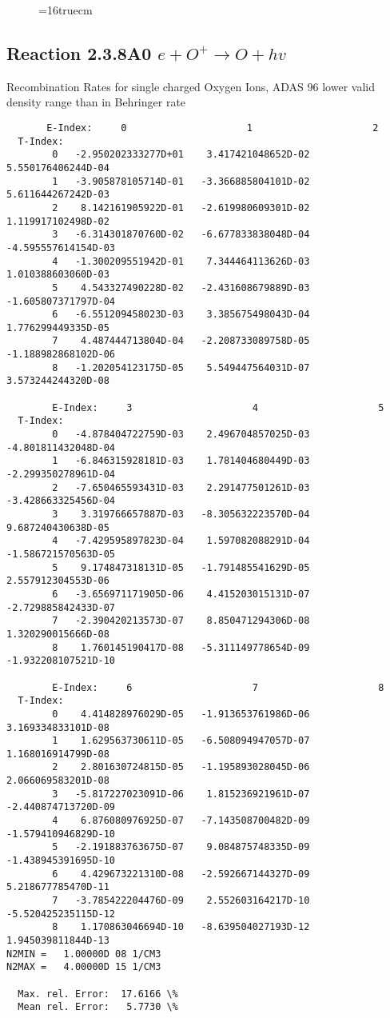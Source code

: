 \documentclass[12pt,dvipdfmx]{article}
\begin{document}
\begin{figure} \label{2.3.7A0}
\epsfxsize=16truecm 
\end{figure}
\newpage

\subsection{
Reaction 2.3.8A0  $e + O^{+} \rightarrow O + hv$ }
 Recombination Rates for single  charged Oxygen Ions, ADAS 96
 lower valid density range than in Behringer rate

\begin{small}\begin{verbatim}
       E-Index:     0                     1                     2
  T-Index:
        0   -2.950202333277D+01    3.417421048652D-02    5.550176406244D-04
        1   -3.905878105714D-01   -3.366885804101D-02    5.611644267242D-03
        2    8.142161905922D-01   -2.619980609301D-02    1.119917102498D-02
        3   -6.314301870760D-02   -6.677833838048D-04   -4.595557614154D-03
        4   -1.300209551942D-01    7.344464113626D-03    1.010388603060D-03
        5    4.543327490228D-02   -2.431608679889D-03   -1.605807371797D-04
        6   -6.551209458023D-03    3.385675498043D-04    1.776299449335D-05
        7    4.487444713804D-04   -2.208733089758D-05   -1.188982868102D-06
        8   -1.202054123175D-05    5.549447564031D-07    3.573244244320D-08

        E-Index:     3                     4                     5
  T-Index:
        0   -4.878404722759D-03    2.496704857025D-03   -4.801811432048D-04
        1   -6.846315928181D-03    1.781404680449D-03   -2.299350278961D-04
        2   -7.650465593431D-03    2.291477501261D-03   -3.428663325456D-04
        3    3.319766657887D-03   -8.305632223570D-04    9.687240430638D-05
        4   -7.429595897823D-04    1.597082088291D-04   -1.586721570563D-05
        5    9.174847318131D-05   -1.791485541629D-05    2.557912304553D-06
        6   -3.656971171905D-06    4.415203015131D-07   -2.729885842433D-07
        7   -2.390420213573D-07    8.850471294306D-08    1.320290015666D-08
        8    1.760145190417D-08   -5.311149778654D-09   -1.932208107521D-10

        E-Index:     6                     7                     8
  T-Index:
        0    4.414828976029D-05   -1.913653761986D-06    3.169334833101D-08
        1    1.629563730611D-05   -6.508094947057D-07    1.168016914799D-08
        2    2.801630724815D-05   -1.195893028045D-06    2.066069583201D-08
        3   -5.817227023091D-06    1.815236921961D-07   -2.440874713720D-09
        4    6.876080976925D-07   -7.143508700482D-09   -1.579410946829D-10
        5   -2.191883763675D-07    9.084875748335D-09   -1.438945391695D-10
        6    4.429673221310D-08   -2.592667144327D-09    5.218677785470D-11
        7   -3.785422204476D-09    2.552603164217D-10   -5.520425235115D-12
        8    1.170863046694D-10   -8.639504027193D-12    1.945039811844D-13
N2MIN =   1.00000D 08 1/CM3
N2MAX =   4.00000D 15 1/CM3

  Max. rel. Error:  17.6166 \%
  Mean rel. Error:   5.7730 \%

\end{verbatim}\end{small}
\end{document}
